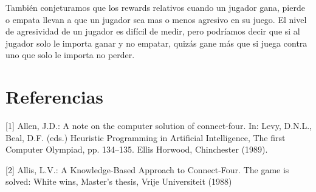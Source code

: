 \documentclass[10pt,a4paper]{article}
\begin{document}
También conjeturamos que los rewards relativos cuando un jugador gana, pierde o empata llevan a que un jugador sea mas o menos agresivo en su juego. El nivel de agresividad de un jugador es difícil de medir, pero podríamos decir que si al jugador solo le importa ganar y no empatar, quizás gane más que si juega contra uno que solo le importa no perder.

\section{Referencias}

[1] Allen, J.D.: A note on the computer solution of connect-four. In: Levy, D.N.L., Beal, D.F. (eds.) Heuristic Programming in Artificial Intelligence, The first Computer Olympiad, pp. 134–135. Ellis Horwood, Chinchester (1989).

[2] Allis, L.V.: A Knowledge-Based Approach to Connect-Four. The game is solved: White wins, Master’s thesis, Vrije Universiteit (1988)
\end{document}
